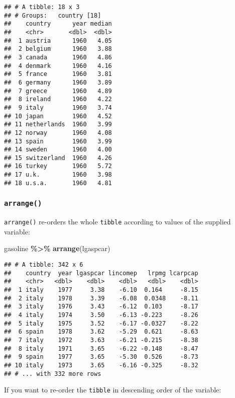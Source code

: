 \documentclass[
]{article}
\newenvironment{Shaded}{\begin{snugshade}}{\end{snugshade}}
\newcommand{\KeywordTok}[1]{\textcolor[rgb]{0.13,0.29,0.53}{\textbf{#1}}}
\newcommand{\NormalTok}[1]{#1}
\newcommand{\OperatorTok}[1]{\textcolor[rgb]{0.81,0.36,0.00}{\textbf{#1}}}
\newcommand{\StringTok}[1]{\textcolor[rgb]{0.31,0.60,0.02}{#1}}
\begin{document}
\begin{verbatim}
## # A tibble: 18 x 3
## # Groups:   country [18]
##    country      year median
##    <chr>       <dbl>  <dbl>
##  1 austria      1960   4.05
##  2 belgium      1960   3.88
##  3 canada       1960   4.86
##  4 denmark      1960   4.16
##  5 france       1960   3.81
##  6 germany      1960   3.89
##  7 greece       1960   4.89
##  8 ireland      1960   4.22
##  9 italy        1960   3.74
## 10 japan        1960   4.52
## 11 netherlands  1960   3.99
## 12 norway       1960   4.08
## 13 spain        1960   3.99
## 14 sweden       1960   4.00
## 15 switzerland  1960   4.26
## 16 turkey       1960   5.72
## 17 u.k.         1960   3.98
## 18 u.s.a.       1960   4.81
\end{verbatim}

\hypertarget{arrange}{%
\subsubsection{\texorpdfstring{\texttt{arrange()}}{arrange()}}\label{arrange}}

\texttt{arrange()} re-orders the whole \texttt{tibble} according to values of the supplied variable:

\begin{Shaded}
\begin{Highlighting}[]
\NormalTok{gasoline }\OperatorTok{\%\textgreater{}\%}
\StringTok{  }\KeywordTok{arrange}\NormalTok{(lgaspcar)}
\end{Highlighting}
\end{Shaded}

\begin{verbatim}
## # A tibble: 342 x 6
##    country  year lgaspcar lincomep   lrpmg lcarpcap
##    <chr>   <dbl>    <dbl>    <dbl>   <dbl>    <dbl>
##  1 italy    1977     3.38    -6.10  0.164     -8.15
##  2 italy    1978     3.39    -6.08  0.0348    -8.11
##  3 italy    1976     3.43    -6.12  0.103     -8.17
##  4 italy    1974     3.50    -6.13 -0.223     -8.26
##  5 italy    1975     3.52    -6.17 -0.0327    -8.22
##  6 spain    1978     3.62    -5.29  0.621     -8.63
##  7 italy    1972     3.63    -6.21 -0.215     -8.38
##  8 italy    1971     3.65    -6.22 -0.148     -8.47
##  9 spain    1977     3.65    -5.30  0.526     -8.73
## 10 italy    1973     3.65    -6.16 -0.325     -8.32
## # ... with 332 more rows
\end{verbatim}

If you want to re-order the \texttt{tibble} in descending order of the variable:
\end{document}

